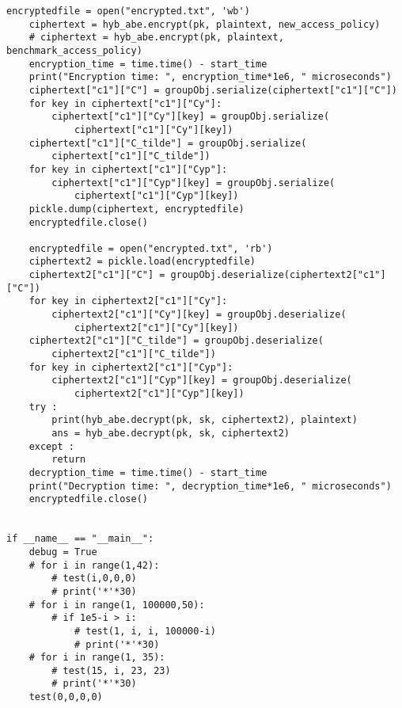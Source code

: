 \begin{lstlisting}[style=mystyle, caption={Sample Code For Ecrypting a File}, label=yourlabel]
    encryptedfile = open("encrypted.txt", 'wb')
    ciphertext = hyb_abe.encrypt(pk, plaintext, new_access_policy)
    # ciphertext = hyb_abe.encrypt(pk, plaintext, benchmark_access_policy)
    encryption_time = time.time() - start_time
    print("Encryption time: ", encryption_time*1e6, " microseconds")
    ciphertext["c1"]["C"] = groupObj.serialize(ciphertext["c1"]["C"])
    for key in ciphertext["c1"]["Cy"]:
        ciphertext["c1"]["Cy"][key] = groupObj.serialize(
            ciphertext["c1"]["Cy"][key])
    ciphertext["c1"]["C_tilde"] = groupObj.serialize(
        ciphertext["c1"]["C_tilde"])
    for key in ciphertext["c1"]["Cyp"]:
        ciphertext["c1"]["Cyp"][key] = groupObj.serialize(
            ciphertext["c1"]["Cyp"][key])
    pickle.dump(ciphertext, encryptedfile)
    encryptedfile.close()

    encryptedfile = open("encrypted.txt", 'rb')
    ciphertext2 = pickle.load(encryptedfile)
    ciphertext2["c1"]["C"] = groupObj.deserialize(ciphertext2["c1"]["C"])
    for key in ciphertext2["c1"]["Cy"]:
        ciphertext2["c1"]["Cy"][key] = groupObj.deserialize(
            ciphertext2["c1"]["Cy"][key])
    ciphertext2["c1"]["C_tilde"] = groupObj.deserialize(
        ciphertext2["c1"]["C_tilde"])
    for key in ciphertext2["c1"]["Cyp"]:
        ciphertext2["c1"]["Cyp"][key] = groupObj.deserialize(
            ciphertext2["c1"]["Cyp"][key])
    try :
        print(hyb_abe.decrypt(pk, sk, ciphertext2), plaintext)
        ans = hyb_abe.decrypt(pk, sk, ciphertext2)
    except :    
        return
    decryption_time = time.time() - start_time
    print("Decryption time: ", decryption_time*1e6, " microseconds")
    encryptedfile.close()


if __name__ == "__main__":
    debug = True
    # for i in range(1,42):
        # test(i,0,0,0)
        # print('*'*30)
    # for i in range(1, 100000,50):
        # if 1e5-i > i:
            # test(1, i, i, 100000-i)
            # print('*'*30)
    # for i in range(1, 35):
        # test(15, i, 23, 23)
        # print('*'*30)
    test(0,0,0,0)
\end{lstlisting}
